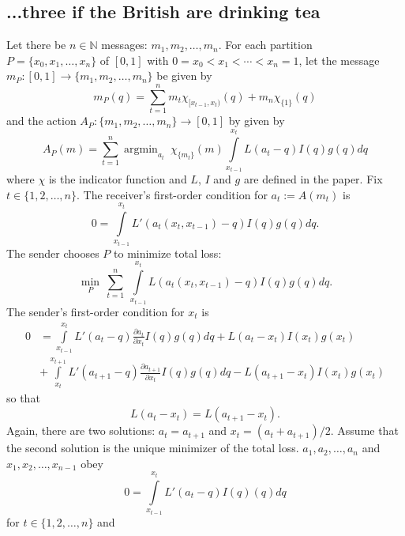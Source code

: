 \documentclass[12pt]{article}
\DeclareMathOperator*{\argmin}{argmin}
\begin{document}
\subsection{...three if the British are drinking tea}
Let there be $n\in\mathbb{N}$ messages: $m_{1},m_{2},\ldots,m_{n}$. For each partition $P=\{x_{0},x_{1},\ldots,x_{n}\}$ of $[0,1]$ with $0=x_{0}<x_{1}<\cdots<x_{n}=1$, let the message $m_{P}:[0,1]\rightarrow\{m_{1},m_{2},\ldots,m_{n}\}$ be given by
\begin{equation*}
m_{P}(q)=\sum_{t=1}^{n}m_{t}\chi_{[x_{t-1},x_{t})}(q)+m_{n}\chi_{\{1\}}(q)
\end{equation*}
and the action $A_{P}:\{m_{1},m_{2},\ldots,m_{n}\}\rightarrow[0,1]$ by given by
\begin{equation*}
A_{P}(m)=\sum_{t=1}^{n}\argmin_{a_{t}}\:\chi_{\{m_{t}\}}(m)\int\limits_{x_{t-1}}^{x_{t}}{L(a_{t}-q)I(q)g(q)dq}
\end{equation*}
where $\chi$ is the indicator function and $L$, $I$ and $g$ are defined in the paper. Fix $t\in\{1,2,\ldots,n\}$. The receiver's first-order condition for $a_{t}:=A(m_{t})$ is 
\begin{equation*}
0=\int\limits_{x_{t-1}}^{x_{t}}{L'(a_{t}(x_{t},x_{t-1})-q)I(q)g(q)dq}.
\end{equation*}
The sender chooses $P$ to minimize total loss:
\begin{equation*}
\min_{P}\:\sum_{t=1}^{n}\:\int\limits_{x_{t-1}}^{x_{t}}{L(a_{t}(x_{t},x_{t-1})-q)I(q)g(q)dq}.
\end{equation*}
The sender's first-order condition for $x_{t}$ is
\begin{align*}
0&=\int\limits_{x_{t-1}}^{x_{t}}{L'(a_{t}-q)\frac{\partial a_{t}}{\partial x_{t}}I(q)g(q)dq}+L(a_{t}-x_{t})I(x_{t})g(x_{t})\\
&+\int\limits_{x_{t}}^{x_{t+1}}{L'(a_{t+1}-q)\frac{\partial a_{t+1}}{\partial x_{t}}I(q)g(q)dq}-L(a_{t+1}-x_{t})I(x_{t})g(x_{t})
\end{align*}
so that
\begin{equation*}
L(a_{t}-x_{t})=L(a_{t+1}-x_{t}).
\end{equation*}
Again, there are two solutions: $a_{t}=a_{t+1}$ and $x_{t}=(a_{t}+a_{t+1})/2$. Assume that the second solution is the unique minimizer of the total loss. $a_{1},a_{2},\ldots,a_{n}$ and $x_{1},x_{2},\ldots,x_{n-1}$ obey
\begin{equation*}
0=\int\limits_{x_{t-1}}^{x_{t}}{L'(a_{t}-q)I(q)(q)dq}
\end{equation*}
for $t\in\{1,2,\ldots,n\}$ and 
\end{document}
